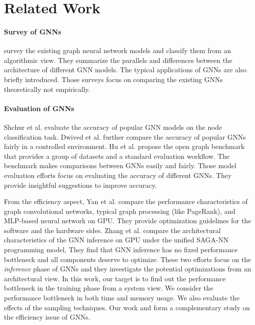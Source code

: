 \section{Related Work}
\label{sec:related_work}

\paragraph{Survey of GNNs}
\cite{zhou2018_gnn_review,zhang2018_gnn_survey,comprehensive-survey-wu-2020} survey the existing graph neural network models and classify them from an algorithmic view.
They summarize the parallels and differences between the architecture of different GNN models.
The typical applications of GNNs are also briefly introduced.
Those surveys focus on comparing the existing GNNs theoretically not empirically.

\paragraph{Evaluation of GNNs}
Shchur et al. \cite{shchur2018_pitfall_of_gnn} evaluate the accuracy of popular GNN models on the node classification task.
Dwived et al. \cite{dwivedi2020_benchmark_of_gnn} further compare the accuracy of popular GNNs fairly in a controlled environment.
Hu et al. \cite{hu2020_open_graph_benchmark} propose the open graph benchmark that provides a group of datasets and a standard evaluation workflow.
The benchmark makes comparisons between GNNs easily and fairly.
Those model evaluation efforts focus on evaluating the accuracy of different GNNs.
They provide insightful suggestions to improve accuracy.

From the efficiency aspect, Yan et al. \cite{yan2020_characterizing_gcn} compare the performance characteristics of graph convolutional networks, typical graph processing (like PageRank), and MLP-based neural network on GPU.
They provide optimization guidelines for the software and the hardware sides.
Zhang et al. \cite{zhang2020_analysis_neugraph} compare the architectural characteristics of the GNN inference on GPU under the unified SAGA-NN \cite{ma2019_neugraph} programming model,
They find that GNN inference has no fixed performance bottleneck and all components deserve to optimize.
These two efforts focus on the \emph{inference} phase of GNNs and they investigate the potential optimizations from an architectural view.
In this work, our target is to find out the performance bottleneck in the training phase from a system view.
We consider the performance bottleneck in both time and memory usage.
We also evaluate the effects of the sampling techniques.
Our work and \cite{yan2020_characterizing_gcn, zhang2020_analysis_neugraph} form a complementary study on the efficiency issue of GNNs.

